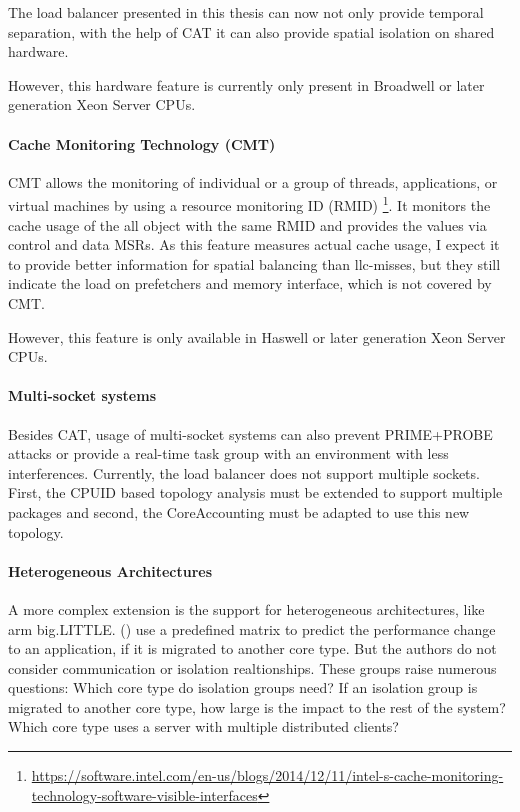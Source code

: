 The load balancer presented in  this thesis can now not only provide temporal
separation, with the help of CAT it can also provide spatial isolation on
shared hardware.

However, this hardware feature is currently only present in Broadwell or later
generation Xeon Server CPUs.

\paragraph{Cache Monitoring Technology (CMT)}
CMT allows the monitoring of individual or a group of threads, applications, or
virtual machines by using a resource monitoring ID (RMID)
\footnote{
  \url{https://software.intel.com/en-us/blogs/2014/12/11/intel-s-cache-monitoring-technology-software-visible-interfaces}}.
It monitors the cache usage of the all object with the same RMID and provides
the values via control and data MSRs.
As this feature measures actual cache usage, I expect it to provide better
information for spatial balancing than \gls{llc}-misses, but they still
indicate the load on prefetchers and memory interface, which is not covered by
CMT.

However, this feature is only available in Haswell or later generation
Xeon Server CPUs.

\paragraph{Multi-socket systems}
Besides CAT, usage of multi-socket systems can also prevent PRIME+PROBE attacks
or provide a real-time task group with an environment with less interferences.
Currently, the load balancer does not support multiple sockets.
First, the CPUID based topology analysis must be extended to support multiple
packages and second, the CoreAccounting must be adapted to use this new
topology.

\paragraph{Heterogeneous Architectures}
A more complex extension is the support for heterogeneous architectures, like
\gls{arm} big.LITTLE.
\citeauthor{sarma_smartbalance_2015} (\cite{sarma_smartbalance_2015}) use a 
predefined matrix to predict the performance change to an application,
if it is migrated to another core type.
But the authors do not consider communication or isolation realtionships.
These groups raise numerous questions: Which core type do isolation groups
need?
If an isolation group is migrated to another core type, how large is the impact
to the rest of the system?
Which core type uses a server with multiple distributed clients?

